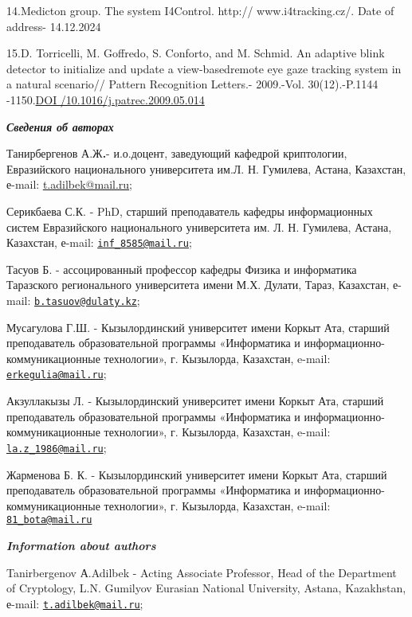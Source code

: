 \documentclass[
]{article}
\begin{document}
14.Medicton group. The system I4Control. http:// www.i4tracking.cz/.
Date of address- 14.12.2024

15.D. Torricelli, M. Goffredo, S. Conforto, and M. Schmid. An adaptive
blink detector to initialize and update a view-basedremote eye gaze
tracking system in a natural scenario// Pattern Recognition Letters.-
2009.-Vol. 30(12).-P.1144
-1150.\href{https://doi.org/10.1016/j.patrec.2009.05.014}{DOI
/10.1016/j.patrec.2009.05.014}

\emph{\textbf{Сведения об авторах}}

Танирбергенов А.Ж\textbf{.}- и.о.доцент, заведующий кафедрой
криптологии, Евразийского национального университета им.Л. Н. Гумилева,
Астана, Казахстан, е-mail:
\href{mailto:t.adilbek@mail.ru}{\ul{t.adilbek@mail.ru}};

Серикбаева С.К. - PhD, старший преподаватель кафедры информационных
систем Евразийского национального университета им. Л. Н. Гумилева,
Астана, Казахстан, е-mail:
\ul{\href{mailto:inf_8585@mail.ru}{\nolinkurl{inf\_8585@mail.ru}};}

Тасуов Б. - ассоцированный профессор кафедры Физика и информатика
Таразского регионального университета имени М.Х. Дулати, Тараз,
Казахстан, е-mail:
\href{mailto:b.tasuov@dulaty.kz}{\nolinkurl{b.tasuov@dulaty.kz}};

Мусагулова Г.Ш. - Кызылординский университет имени Коркыт Ата, старший
преподаватель образовательной программы «Информатика и
информационно-коммуникационные технологии», г. Кызылорда, Казахстан,
e-mail: \href{mailto:erkegulia@mail.ru}{\nolinkurl{erkegulia@mail.ru}};

Акзуллакызы Л. - Кызылординский университет имени Коркыт Ата, старший
преподаватель образовательной программы «Информатика и
информационно-коммуникационные технологии», г. Кызылорда, Казахстан,
e-mail: \href{mailto:la.z_1986@mail.ru}{\nolinkurl{la.z\_1986@mail.ru}};

Жарменова Б. К. - Кызылординский университет имени Коркыт Ата, старший
преподаватель образовательной программы «Информатика и
информационно-коммуникационные технологии», г. Кызылорда, Казахстан,
e-mail: \href{mailto:81_bota@mail.ru}{\nolinkurl{81\_bota@mail.ru}}

\emph{\textbf{Information about authors}}

Tanirbergenov А.Adilbek - Acting Associate Professor, Head of the
Department of Cryptology, L.N. Gumilyov Eurasian National University,
Astana, Kazakhstan, е-mail:
\ul{\href{mailto:t.adilbek@mail.ru}{\nolinkurl{t.adilbek@mail.ru}};}
\end{document}

